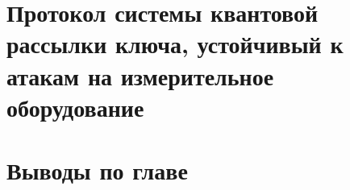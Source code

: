 \section{Протокол системы квантовой рассылки ключа, устойчивый к атакам на измерительное оборудование} \label{ch:ch4/sect7}


\section{Выводы по главе} \label{ch:ch4/sect8}



